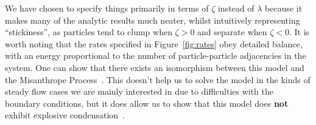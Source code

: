 We have chosen to specify things primarily in terms of $\zeta$ instead of $\lambda$ because it makes many of the analytic results much neater, whilst intuitively representing ``stickiness'', as
particles tend to clump when $\zeta>0$ and separate when $\zeta<0$. It is worth noting that the rates specified in Figure~\ref{fig:rates} obey detailed balance, with an energy proportional to the number of particle-particle adjacencies
in the system. One can show that there exists an isomorphism between this model and the Misanthrope Process~\cite{evansWaclaw2014}. This doesn't help us to solve the model in the kinds of steady flow cases we are mainly interested in due to
difficulties with the boundary conditions, but it does allow us to show that this model does \textbf{not} exhibit explosive condensation~\cite{waclaw2012explosive}.


